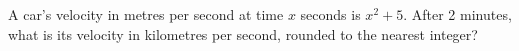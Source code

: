 A car's velocity in metres per second at time $x$ seconds is $x^2+5$. After 2 minutes, what is its velocity in kilometres per second, rounded to the nearest integer?
